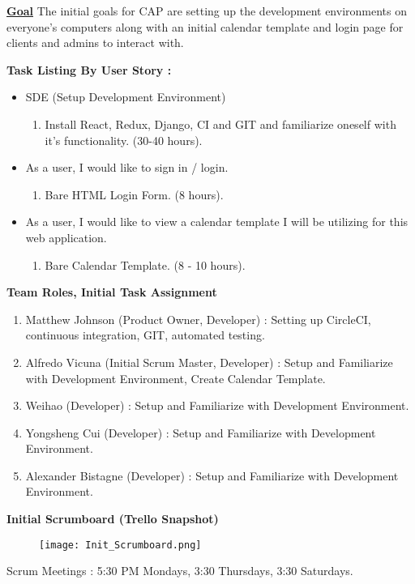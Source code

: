 \documentclass[2pt]{article}
\begin{document}
\begin{flushleft}
        \item \textbf{\underline{Goal}} \indent The initial goals for CAP are setting up the development environments on everyone's computers along with an initial calendar template and login page for clients and admins to interact with.
        \item \textbf{Task Listing By User Story :}
        \begin{itemize}
            \item SDE (Setup Development Environment)
            \begin{enumerate}
                \item Install React, Redux, Django, CI and GIT and familiarize oneself with it's functionality. (30-40 hours).
            \end{enumerate}
            \item As a user, I would like to sign in / login.
            \begin{enumerate}[resume]
                \item Bare HTML Login Form. (8 hours).
            \end{enumerate}
            \item As a user, I would like to view a calendar template I will be utilizing for this web application.
            \begin{enumerate}[resume]
                \item Bare Calendar Template.  (8 - 10 hours).
            \end{enumerate}
        \end{itemize}
        \item \item \textbf{Team Roles, Initial Task Assignment }
        \begin{enumerate}
            \item Matthew Johnson (Product Owner, Developer) :  Setting up CircleCI, continuous integration, GIT, automated testing.
            \item Alfredo Vicuna  (Initial Scrum Master, Developer) : Setup and Familiarize with Development Environment, Create Calendar Template.
            \item Weihao (Developer) : Setup and Familiarize with Development Environment.
            \item Yongsheng Cui (Developer) : Setup and Familiarize with Development Environment.
            \item Alexander Bistagne (Developer) : Setup and Familiarize with Development Environment.
        \end{enumerate}

        \item \item \textbf{Initial Scrumboard (Trello Snapshot)}
        \begin{figure}[h]
            \centering
            \texttt{[image: Init\_Scrumboard.png]}
        \end{figure}   

        \item \item Scrum Meetings : 5:30 PM Mondays, 3:30 Thursdays, 3:30 Saturdays.
    \end{flushleft}
\end{document}
